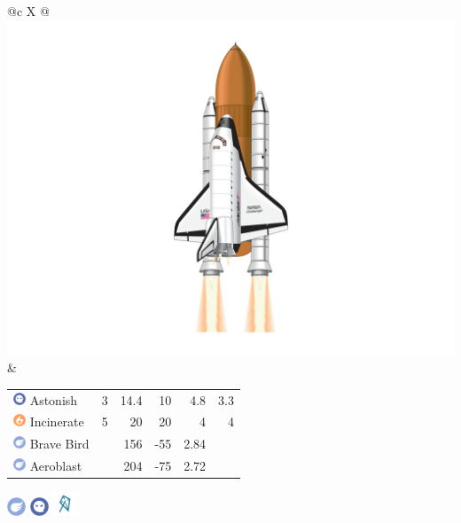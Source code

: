 \documentclass[ebook,10pt,openany,oneside]{memoir}
\begin{document}
\begin{speciesbox}[title=OV-099 Challenger,title style={left color=Flying,right color=Ghost},after title={\hfill 200 120 100 140.00 133.89}]
\footnotesize
\begin{tabularx}{\linewidth}{@{}c X @{}}
\includegraphics[width=0.3\linewidth,valign=c,keepaspectratio]{images/challenger.png} &
\begingroup
\setlength{\tabcolsep}{4pt}
\begin{tabular}{lrrrrr}
\includegraphics[height=1em,keepaspectratio]{images/ghost.png} Astonish & 3 & 14.4 & 10 & 4.8 & 3.3 \\
\includegraphics[height=1em,keepaspectratio]{images/fire.png} Incinerate & 5 & 20 & 20 & 4 & 4 \\
\includegraphics[height=1em,keepaspectratio]{images/flying.png} Brave Bird & & 156 & -55 & 2.84 & \\
\includegraphics[height=1em,keepaspectratio]{images/flying.png} Aeroblast & & 204 & -75 & 2.72 & \\
\end{tabular}
\endgroup
\end{tabularx}
\noindent\begin{minipage}{0.3\linewidth}
\includegraphics[height=1.5em,keepaspectratio]{images/flying.png}
\includegraphics[height=1.5em,keepaspectratio]{images/ghost.png}
\includegraphics[height=2em,keepaspectratio]{images/windy.png}

\end{minipage}
\end{speciesbox}
\end{document}
